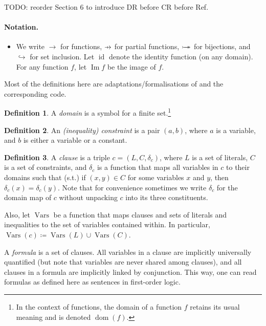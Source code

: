 \documentclass{article}
\theoremstyle{definition}
\newtheorem{definition}{Definition}
\theoremstyle{remark}
\newcommand\pfun{\mathrel{\ooalign{\hfil$\mapstochar\mkern5mu$\hfil\cr$\to$\cr}}}
\newcommand*{\twoheadrightarrowtail}{\mathrel{\rightarrowtail\kern-1.9ex\twoheadrightarrow}}
\DeclareMathOperator{\dom}{dom}
\DeclareMathOperator{\id}{id}
\DeclareMathOperator{\Imm}{Im}
\DeclareMathOperator{\Vars}{Vars}
\begin{document}
TODO: reorder Section 6 to introduce DR before CR before Ref.

\paragraph{Notation.}
\begin{itemize}
\item We write $\to$ for functions, $\pfun$ for partial functions, $\twoheadrightarrowtail$ for bijections, and $\hookrightarrow$ for set inclusion. Let $\id$ denote the identity function (on any domain). For any function $f$, let $\Imm f$ be the image of $f$.
\end{itemize}

Most of the definitions here are adaptations/formalisations of \cite{DBLP:conf/ijcai/BroeckTMDR11} and the corresponding code.

\begin{definition}
  A \emph{domain} is a symbol for a finite set.\footnote{In the context of functions, the domain of a function $f$ retains its usual meaning and is denoted $\dom(f)$.}
\end{definition}

\begin{definition}
  An \emph{(inequality) constraint} is a pair $(a, b)$, where $a$ is a variable, and $b$ is either a variable or a constant.
\end{definition}

\begin{definition}
  A \emph{clause} is a triple $c = (L, C, \delta_c)$, where $L$ is a set of literals, $C$ is a set of constraints, and $\delta_c$ is a function that maps all variables in $c$ to their domains such that (s.t.) if $(x, y) \in C$ for some variables $x$ and $y$, then $\delta_c(x) = \delta_c(y)$. Note that for convenience sometimes we write $\delta_c$ for the domain map of $c$ without unpacking $c$ into its three constituents.

  Also, let $\Vars$ be a function that maps clauses and sets of literals and inequalities to the set of variables contained within. In particular, $\Vars(c) \coloneqq \Vars(L) \cup \Vars(C)$.
\end{definition}

A \emph{formula} is a set of clauses. All variables in a clause are implicitly universally quantified (but note that variables are never shared among clauses), and all clauses in a formula are implicitly linked by conjunction. This way, one can read formulas as defined here as sentences in first-order logic.
\end{document}

